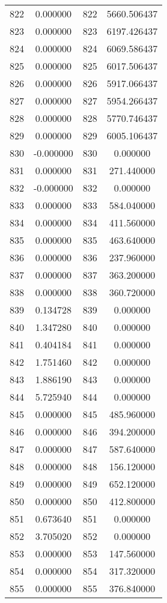 \documentclass[12pt]{article}
\begin{document}
\begin{longtable}{@{}cccc@{}}
822 & 0.000000 & 822 & 5660.506437 \\
823 & 0.000000 & 823 & 6197.426437 \\
824 & 0.000000 & 824 & 6069.586437 \\
825 & 0.000000 & 825 & 6017.506437 \\
826 & 0.000000 & 826 & 5917.066437 \\
827 & 0.000000 & 827 & 5954.266437 \\
828 & 0.000000 & 828 & 5770.746437 \\
829 & 0.000000 & 829 & 6005.106437 \\
830 & -0.000000 & 830 & 0.000000 \\
831 & 0.000000 & 831 & 271.440000 \\
832 & -0.000000 & 832 & 0.000000 \\
833 & 0.000000 & 833 & 584.040000 \\
834 & 0.000000 & 834 & 411.560000 \\
835 & 0.000000 & 835 & 463.640000 \\
836 & 0.000000 & 836 & 237.960000 \\
837 & 0.000000 & 837 & 363.200000 \\
838 & 0.000000 & 838 & 360.720000 \\
839 & 0.134728 & 839 & 0.000000 \\
840 & 1.347280 & 840 & 0.000000 \\
841 & 0.404184 & 841 & 0.000000 \\
842 & 1.751460 & 842 & 0.000000 \\
843 & 1.886190 & 843 & 0.000000 \\
844 & 5.725940 & 844 & 0.000000 \\
845 & 0.000000 & 845 & 485.960000 \\
846 & 0.000000 & 846 & 394.200000 \\
847 & 0.000000 & 847 & 587.640000 \\
848 & 0.000000 & 848 & 156.120000 \\
849 & 0.000000 & 849 & 652.120000 \\
850 & 0.000000 & 850 & 412.800000 \\
851 & 0.673640 & 851 & 0.000000 \\
852 & 3.705020 & 852 & 0.000000 \\
853 & 0.000000 & 853 & 147.560000 \\
854 & 0.000000 & 854 & 317.320000 \\
855 & 0.000000 & 855 & 376.840000 \\

\end{longtable}
\end{document}
